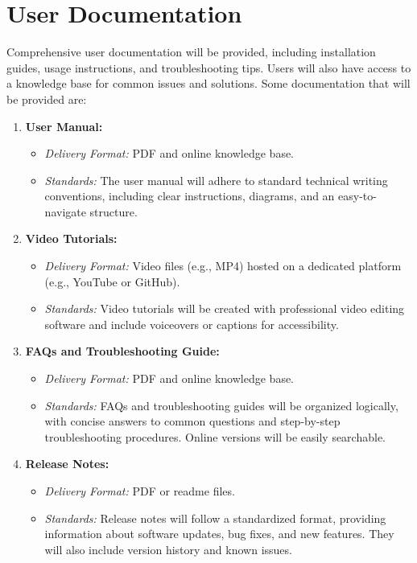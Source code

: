 \documentclass{scrreprt}
\begin{document}
    \section{User Documentation}
        Comprehensive user documentation will be provided, including installation guides, usage instructions, and troubleshooting tips. Users will also have access to a knowledge base for common issues and solutions. Some documentation that will be provided are:
        \begin{enumerate}
                \item \textbf{User Manual:}
                    \begin{itemize}
                        \item \textit{Delivery Format:} PDF and online knowledge base.
                        \item \textit{Standards:} The user manual will adhere to standard technical writing conventions, including clear instructions, diagrams, and an easy-to-navigate structure.
                    \end{itemize}
                \item \textbf{Video Tutorials:}
                    \begin{itemize}
                        \item \textit{Delivery Format:} Video files (e.g., MP4) hosted on a dedicated platform (e.g., YouTube or GitHub).
                        \item \textit{Standards:} Video tutorials will be created with professional video editing software and include voiceovers or captions for accessibility.    
                    \end{itemize}
                \item \textbf{FAQs and Troubleshooting Guide:}
                    \begin{itemize}
                        \item \textit{Delivery Format:} PDF and online knowledge base.
                        \item \textit{Standards:} FAQs and troubleshooting guides will be organized logically, with concise answers to common questions and step-by-step troubleshooting procedures. Online versions will be easily searchable.
                    \end{itemize}
                \item \textbf{Release Notes:}
                    \begin{itemize}
                        \item \textit{Delivery Format:} PDF or readme files.
                        \item \textit{Standards:}  Release notes will follow a standardized format, providing information about software updates, bug fixes, and new features. They will also include version history and known issues.
                    \end{itemize}
            \end{enumerate}
    
\end{document}
